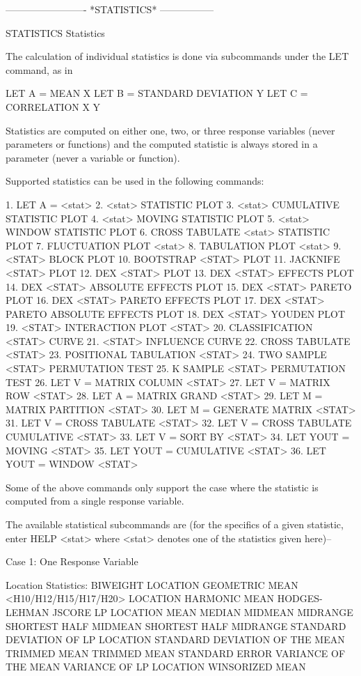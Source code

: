  
 
 


-------------------------  *STATISTICS*  -----------------
 
STATISTICS
Statistics
 
The calculation of individual statistics is done via subcommands under
the LET command, as in
 
   LET A = MEAN X
   LET B = STANDARD DEVIATION Y
   LET C = CORRELATION X Y
 
Statistics are computed on either one, two, or three response variables
(never parameters or functions) and the computed statistic is always
stored in a parameter (never a variable or function).

Supported statistics can be used in the following commands:

   1. LET A = <stat>
   2. <stat> STATISTIC PLOT
   3. <stat> CUMULATIVE STATISTIC PLOT
   4. <stat> MOVING STATISTIC PLOT
   5. <stat> WINDOW STATISTIC PLOT
   6. CROSS TABULATE <stat> STATISTIC PLOT
   7. FLUCTUATION PLOT <stat>
   8. TABULATION PLOT <stat>
   9. <STAT> BLOCK PLOT
  10. BOOTSTRAP <STAT> PLOT
  11. JACKNIFE <STAT> PLOT
  12. DEX <STAT> PLOT
  13. DEX <STAT> EFFECTS PLOT
  14. DEX <STAT> ABSOLUTE EFFECTS PLOT
  15. DEX <STAT> PARETO PLOT
  16. DEX <STAT> PARETO EFFECTS PLOT
  17. DEX <STAT> PARETO ABSOLUTE EFFECTS PLOT
  18. DEX <STAT> YOUDEN PLOT
  19. <STAT> INTERACTION PLOT <STAT>
  20. CLASSIFICATION <STAT> CURVE
  21. <STAT> INFLUENCE CURVE
  22. CROSS TABULATE <STAT>
  23. POSITIONAL TABULATION <STAT>
  24. TWO SAMPLE <STAT> PERMUTATION TEST
  25. K SAMPLE <STAT> PERMUTATION TEST
  26. LET V = MATRIX COLUMN <STAT>
  27. LET V = MATRIX ROW <STAT>
  28. LET A = MATRIX GRAND <STAT>
  29. LET M = MATRIX PARTITION <STAT>
  30. LET M = GENERATE MATRIX <STAT>
  31. LET V = CROSS TABULATE <STAT>
  32. LET V = CROSS TABULATE CUMULATIVE <STAT>
  33. LET V = SORT BY <STAT>
  34. LET YOUT = MOVING <STAT>
  35. LET YOUT = CUMULATIVE <STAT>
  36. LET YOUT = WINDOW <STAT>

Some of the above commands only support the case where the
statistic is computed from a single response variable.

The available statistical subcommands are (for the specifics of a
given statistic, enter HELP <stat> where <stat> denotes one of the
statistics given here)--
 
Case 1: One Response Variable

Location Statistics:
   BIWEIGHT LOCATION
   GEOMETRIC MEAN
   <H10/H12/H15/H17/H20> LOCATION
   HARMONIC MEAN
   HODGES-LEHMAN
   JSCORE
   LP LOCATION
   MEAN
   MEDIAN
   MIDMEAN
   MIDRANGE
   SHORTEST HALF MIDMEAN
   SHORTEST HALF MIDRANGE
   STANDARD DEVIATION OF LP LOCATION
   STANDARD DEVIATION OF THE MEAN
   TRIMMED MEAN
   TRIMMED MEAN STANDARD ERROR
   VARIANCE OF THE MEAN
   VARIANCE OF LP LOCATION
   WINSORIZED MEAN

